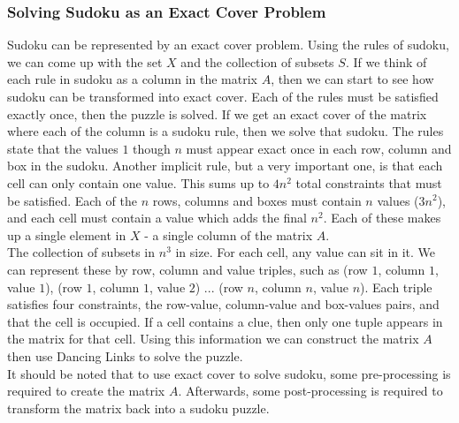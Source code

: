     \subsubsection{Solving Sudoku as an Exact Cover Problem}
    Sudoku can be represented by an exact cover problem. Using the rules of sudoku, we can come up with the set $X$ and the collection
    of subsets $S$. If we think of each rule in sudoku as a column in the matrix $A$, then we can start to see how sudoku can be transformed
    into exact cover. Each of the rules must be satisfied exactly once, then the puzzle is solved. If we get an exact cover of the matrix where
    each of the column is a sudoku rule, then we solve that sudoku. The rules state that the values $1$ though $n$ must appear exact once in each
    row, column and box in the sudoku. Another implicit rule, but a very important one, is that each cell can only contain one value. This sums up
    to $4n^2$ total constraints that must be satisfied. Each of the $n$ rows, columns and boxes must contain $n$ values ($3n^2$), and each cell must
    contain a value which adds the final $n^2$. Each of these makes up a single element in $X$ - a single column of the matrix $A$.\\
    The collection of subsets in $n^3$ in size. For each cell, any value can sit in it. We can represent these by row, column and value triples,
    such as (row $1$, column $1$, value $1$), (row $1$, column $1$, value $2$) ... (row $n$, column $n$, value $n$). Each triple satisfies four
    constraints, the row-value, column-value and box-values pairs, and that the cell is occupied. If a cell contains a clue, then only one tuple
    appears in the matrix for that cell. Using this information we can construct the matrix $A$ then use Dancing Links to solve the puzzle.\\
    It should be noted that to use exact cover to solve sudoku, some pre-processing is required to create the matrix $A$. Afterwards, some
    post-processing is required to transform the matrix back into a sudoku puzzle.

